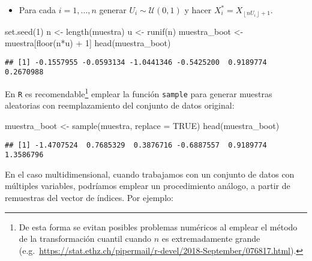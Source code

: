 \documentclass[
]{book}
\newenvironment{Shaded}{\begin{snugshade}}{\end{snugshade}}
\newcommand{\AttributeTok}[1]{\textcolor[rgb]{0.77,0.63,0.00}{#1}}
\newcommand{\ConstantTok}[1]{\textcolor[rgb]{0.00,0.00,0.00}{#1}}
\newcommand{\DecValTok}[1]{\textcolor[rgb]{0.00,0.00,0.81}{#1}}
\newcommand{\FunctionTok}[1]{\textcolor[rgb]{0.00,0.00,0.00}{#1}}
\newcommand{\NormalTok}[1]{#1}
\newcommand{\OtherTok}[1]{\textcolor[rgb]{0.56,0.35,0.01}{#1}}
\newcommand{\SpecialCharTok}[1]{\textcolor[rgb]{0.00,0.00,0.00}{#1}}
\providecommand{\tightlist}{%
  \setlength{\itemsep}{0pt}\setlength{\parskip}{0pt}}
\theoremstyle{break}
\theoremstyle{definition}
\theoremstyle{definition}
\theoremstyle{definition}
\theoremstyle{definition}
\theoremstyle{remark}
\begin{document}
\begin{itemize}
\tightlist
\item
  Para cada \(i=1,\ldots ,n\)
  generar \(U_i\sim \mathcal{U}\left( 0,1 \right)\) y
  hacer \(X_i^{\ast}=X_{\left\lfloor nU_i\right\rfloor +1}\).
\end{itemize}

\begin{Shaded}
\begin{Highlighting}[]
\FunctionTok{set.seed}\NormalTok{(}\DecValTok{1}\NormalTok{)}
\NormalTok{n }\OtherTok{\textless{}{-}} \FunctionTok{length}\NormalTok{(muestra)}
\NormalTok{u }\OtherTok{\textless{}{-}} \FunctionTok{runif}\NormalTok{(n)}
\NormalTok{muestra\_boot }\OtherTok{\textless{}{-}}\NormalTok{ muestra[}\FunctionTok{floor}\NormalTok{(n}\SpecialCharTok{*}\NormalTok{u) }\SpecialCharTok{+} \DecValTok{1}\NormalTok{]}
\FunctionTok{head}\NormalTok{(muestra\_boot)}
\end{Highlighting}
\end{Shaded}

\begin{verbatim}
## [1] -0.1557955 -0.0593134 -1.0441346 -0.5425200  0.9189774  0.2670988
\end{verbatim}

En \texttt{R} es recomendable\footnote{De esta forma se evitan posibles problemas numéricos
  al emplear el método de la transformación cuantil cuando \(n\) es extremadamente grande
  (e.g.~\url{https://stat.ethz.ch/pipermail/r-devel/2018-September/076817.html}).}
emplear la función \texttt{sample} para generar muestras aleatorias con reemplazamiento
del conjunto de datos original:

\begin{Shaded}
\begin{Highlighting}[]
\NormalTok{muestra\_boot }\OtherTok{\textless{}{-}} \FunctionTok{sample}\NormalTok{(muestra, }\AttributeTok{replace =} \ConstantTok{TRUE}\NormalTok{)}
\FunctionTok{head}\NormalTok{(muestra\_boot)}
\end{Highlighting}
\end{Shaded}

\begin{verbatim}
## [1] -1.4707524  0.7685329  0.3876716 -0.6887557  0.9189774  1.3586796
\end{verbatim}

En el caso multidimensional, cuando trabajamos con un conjunto de datos
con múltiples variables,
podríamos emplear un procedimiento análogo, a partir de remuestras del
vector de índices. Por ejemplo:
\end{document}
